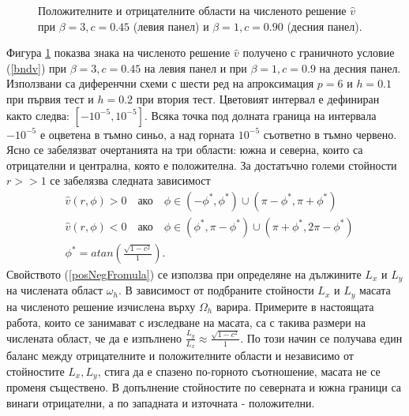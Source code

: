 \documentclass[a4paper]{article}
\newcommand{\rf}[1]{(\ref{#1})}
\theoremstyle{remark}
\begin{document}
\begin{large}
\begin{figure}[ht]
\begin{minipage}[b]{0.49\linewidth}
	\end{minipage}
	\caption{Положителните и отрицателните области на численото решение $\widehat v$ при $\beta = 3, c=0.45$ (левия панел) и $\beta = 1, c=0.90$ (десния панел). }
	\label{fig:posNegDom}
\end{figure}
\FloatBarrier
Фигура \ref{fig:posNegDom} показва знака на численото решение $\widehat v$ получено с граничното условие \rf{bndv} при $\beta=3, c=0.45$ на левия панел и при $\beta=1, c=0.9$ на десния панел. Използвани са диференчни схеми с шести ред на апроксимация $p=6$ и $h=0.1$ при първия тест и $h=0.2$ при втория тест. Цветовият интервал е дефиниран както следва: $[-10^{-5}, 10^{-5}]$. Всяка точка под долната граница на интервала $-10^{-5}$ е оцветена в тъмно синьо, а над горната $10^{-5}$ съответно в тъмно червено. Ясно се забелязват очертанията на три области: южна и северна, които са отрицателни и централна, която е положителна. За достатъчно големи стойности $r >> 1$ се забелязва следната зависимост
\begin{align}\label{posNegFromula}
&\widehat v(r, \phi) > 0 \quad \text{ако} \quad \phi \in (-\phi^*, \phi^*) \cup (\pi - \phi^*, \pi + \phi^*)  \nonumber\\
&\widehat v(r, \phi) < 0 \quad \text{ако} \quad \phi \in (\phi^*, \pi - \phi^*) \cup (\pi + \phi^*, 2\pi-\phi^*) \nonumber\\
&\phi^* = atan(\frac{ \sqrt{1-c^2} }{ 1}).
\end{align}
Свойството \rf{posNegFromula} се използва при определяне на дължините $L_x$ и $L_y$ на числената област $\omega_h$. В зависимост от подбраните стойности $L_x$ и $L_y$ масата на численото решение изчислена върху $\Omega_h$ варира. Примерите в настоящата работа, които се занимават с изследване на масата, са с такива размери на числената област, че да е изпълнено $\frac{L_y}{L_x} \approx \frac{ \sqrt{1-c^2} }{ 1}$. По този начин се получава един баланс между отрицателните и положителните области и независимо от стойностите $L_x, L_y$, стига да е спазено по-горното съотношение, масата не се променя съществено. В допълнение стойностите по северната и южна граници са винаги отрицателни, а по западната и източната -  положителни.

\end{large}
\end{document}
